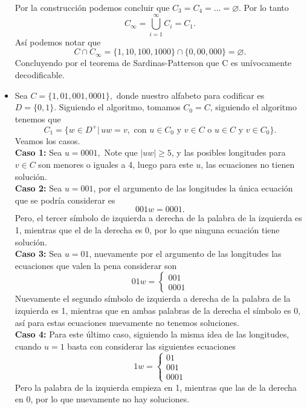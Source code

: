 \begin{sols}
\begin{itemize}
         Por la construcción podemos concluir que $C_3=C_4=\dots=\varnothing.$ Por lo tanto
         $$C_\infty=\bigcup_{i=1}^\infty C_i=C_1.$$
         Así podemos notar que
         $$C\cap C_\infty =\{1,10,100,1000\}\cap\{0,00,000\}=\varnothing.$$
         Concluyendo por el teorema de Sardinas-Patterson que C es unívocamente decodificable.

         \item Sea $C=\{1,01,001,0001\},$ donde nuestro alfabeto para codificar es $D=\{0,1\}.$ Siguiendo el algoritmo, tomamos $C_0=C$, siguiendo el algoritmo tenemos que
         $$C_1=\{w\in D^+|\,uw=v, \text{ con } u\in C_0 \text{ y } v\in C \text{ o } u\in C \text{ y } v\in C_0 \}.$$
         Veamos los casos.\\

         \textbf{Caso 1:} Sea $u=0001,$ Note que $|uw|\geq 5$, y las posibles longitudes para $v\in C$ son menores o iguales a 4, luego para este $u$, las ecuaciones no tienen solución.\\

         \textbf{Caso 2:} Sea $u=001$, por el argumento de las longitudes la única ecuación que se podría considerar es
         $$001w=0001.$$
         Pero, el tercer símbolo de izquierda a derecha de la palabra de la izquierda es 1, mientras que el de la derecha es 0, por lo que ninguna ecuación tiene solución.\\

         \textbf{Caso 3:} Sea $u=01$, nuevamente por el argumento de las longitudes las ecuaciones que valen la pena considerar son
         $$01w=\begin{cases}
             001\\
         0001
         \end{cases}$$
         Nuevamente el segundo símbolo de izquierda a derecha de la palabra de la izquierda es 1, mientras que en ambas palabras de la derecha el símbolo es 0, así para estas ecuaciones nuevamente no tenemos soluciones.\\

         \textbf{Caso 4:} Para este último caso, siguiendo la misma idea de las longitudes, cuando $u=1$ basta con considerar las siguientes ecuaciones
         $$1w=\begin{cases}
             01\\
             001\\
             0001
         \end{cases}$$
         Pero la palabra de la izquierda empieza en 1, mientras que las de la derecha en 0, por lo que nuevamente no hay soluciones.\\


\end{itemize}
\end{sols}
